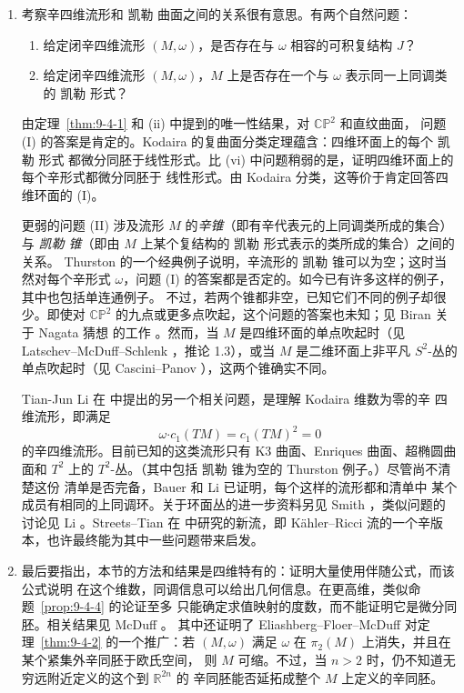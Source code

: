 \begin{remark}
\begin{enumerate}[label=(\roman*),leftmargin=3em]
\item 考察辛四维流形和 凯勒 曲面之间的关系很有意思。有两个自然问题：
\begin{enumerate}[label=(\Roman*),leftmargin=3em]
\item 给定闭辛四维流形 $(M,\omega)$，是否存在与 $\omega$ 相容的可积复结构 $J$？
\item 给定闭辛四维流形 $(M,\omega)$，$M$ 上是否存在一个与 $\omega$ 表示同一上同调类的
凯勒 形式？
\end{enumerate}
由定理~\ref{thm:9-4-1} 和 (ii) 中提到的唯一性结果，对 $\mathbb{CP}^2$ 和直纹曲面，
问题 (I) 的答案是肯定的。Kodaira 的复曲面分类定理蕴含：四维环面上的每个 凯勒 形式
都微分同胚于线性形式。比 (vi) 中问题稍弱的是，证明四维环面上的每个辛形式都微分同胚于
线性形式。由 Kodaira 分类，这等价于肯定回答四维环面的 (I)。

更弱的问题 (II) 涉及流形 $M$ 的\emph{辛锥}（即有辛代表元的上同调类所成的集合）与
\emph{凯勒 锥}（即由 $M$ 上某个复结构的 凯勒 形式表示的类所成的集合）之间的关系。
Thurston 的一个经典例子说明，辛流形的 凯勒 锥可以为空；这时当然对每个辛形式
$\omega$，问题 (I) 的答案都是否定的。如今已有许多这样的例子，其中也包括单连通例子。
不过，若两个锥都非空，已知它们不同的例子却很少。即使对
$\mathbb{CP}^2$ 的九点或更多点吹起，这个问题的答案也未知；见 Biran 关于 Nagata 猜想
的工作 。然而，当 $M$ 是四维环面的单点吹起时（见
Latschev--McDuff--Schlenk ，推论 1.3），或当 $M$ 是二维环面上非平凡
$S^2$-丛的单点吹起时（见 Cascini--Panov ），这两个锥确实不同。

Tian-Jun Li 在  中提出的另一个相关问题，是理解 Kodaira 维数为零的辛
四维流形，即满足
\[
  \omega\mathbin{\boldsymbol\cdot}c_1(TM)=c_1(TM)^2=0
\]
的辛四维流形。目前已知的这类流形只有 K3 曲面、Enriques 曲面、超椭圆曲面和
$T^2$ 上的 $T^2$-丛。（其中包括 凯勒 锥为空的 Thurston 例子。）尽管尚不清楚这份
清单是否完备，Bauer  和 Li  已证明，每个这样的流形都和清单中
某个成员有相同的上同调环。关于环面丛的进一步资料另见 Smith ，类似问题的
讨论见 Li 。Streets--Tian 在  中研究的新流，即 Kähler--Ricci
流的一个辛版本，也许最终能为其中一些问题带来启发。

\item 最后要指出，本节的方法和结果是四维特有的：证明大量使用伴随公式，而该公式说明
在这个维数，同调信息可以给出几何信息。在更高维，类似命题~\ref{prop:9-4-4} 的论证至多
只能确定求值映射的度数，而不能证明它是微分同胚。相关结果见 McDuff 。
其中还证明了 Eliashberg--Floer--McDuff 对定理~\ref{thm:9-4-2} 的一个推广：若
$(M,\omega)$ 满足 $\omega$ 在 $\pi_2(M)$ 上消失，并且在某个紧集外辛同胚于欧氏空间，
则 $M$ 可缩。不过，当 $n>2$ 时，仍不知道无穷远附近定义的这个到 $\mathbb R^{2n}$ 的
辛同胚能否延拓成整个 $M$ 上定义的辛同胚。
\end{enumerate}
\end{remark}


